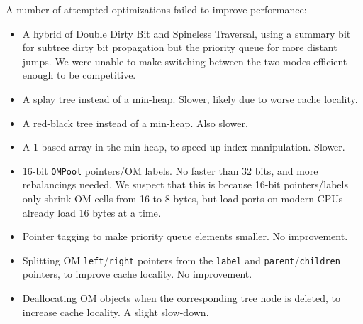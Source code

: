 A number of attempted optimizations
  failed to improve performance:
\begin{itemize}
\item A hybrid of Double Dirty Bit and Spineless Traversal,
    using a summary bit for subtree dirty bit propagation
    but the priority queue for more distant jumps.
  We were unable to make switching between the two modes
    efficient enough to be competitive.
\item A splay tree instead of a min-heap.
  Slower, likely due to worse cache locality.
\item A red-black tree instead of a min-heap. Also slower.
\item A 1-based array in the min-heap, to speed up index manipulation.
  Slower.
\item 16-bit \texttt{OMPool} pointers/OM labels.
  No faster than 32 bits, and more rebalancings needed.
  We suspect that this is because 16-bit pointers/labels
  only shrink OM cells from 16 to 8 bytes,
  but load ports on modern CPUs already load 16 bytes at a time.
\item Pointer tagging to make priority queue elements smaller.
  No improvement.
\item Splitting OM \texttt{left}/\texttt{right} pointers
  from the \texttt{label} and \texttt{parent}/\texttt{children} pointers, to improve cache locality. No improvement.
\item Deallocating OM objects when the corresponding tree node is deleted, to increase cache locality. A slight slow-down.
\end{itemize}